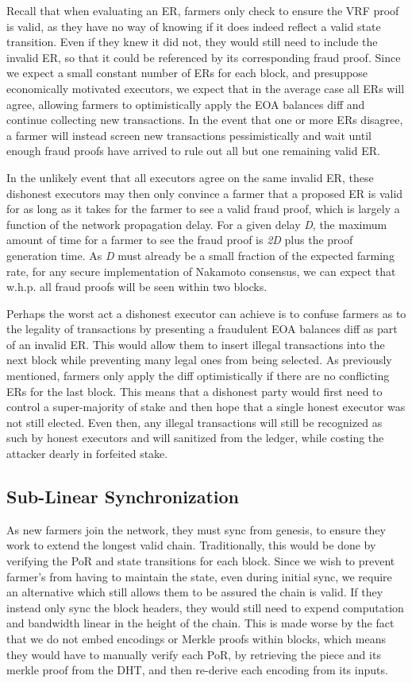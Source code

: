 \documentclass[conference]{IEEEtran}
\begin{document}
Recall that when evaluating an ER, farmers only check to ensure the VRF proof is valid, as they have no way of knowing if it does indeed reflect a valid state transition. Even if they knew it did not, they would still need to include the invalid ER, so that it could be referenced by its corresponding fraud proof. Since we expect a small constant number of ERs for each block, and presuppose economically motivated executors, we expect that in the average case all ERs will agree, allowing farmers to optimistically apply the EOA balances diff and continue collecting new transactions. In the event that one or more ERs disagree, a farmer will instead screen new transactions pessimistically and wait until enough fraud proofs have arrived to rule out all but one remaining valid ER. 

In the unlikely event that all executors agree on the same invalid ER, these dishonest executors may then only convince a farmer that a proposed ER is valid for as long as it takes for the farmer to see a valid fraud proof, which is largely a function of the network propagation delay. For a given delay \textit{D}, the maximum amount of time for a farmer to see the fraud proof is \textit{2D} plus the proof generation time. As \textit{D} must already be a small fraction of the expected farming rate, for any secure implementation of Nakamoto consensus, we can expect that w.h.p. all fraud proofs will be seen within two blocks. 

Perhaps the worst act a dishonest executor can achieve is to confuse farmers as to the legality of transactions by presenting a fraudulent EOA balances diff as part of an invalid ER. This would allow them to insert illegal transactions into the next block while preventing many legal ones from being selected. As previously mentioned, farmers only apply the diff optimistically if there are no conflicting ERs for the last block. This means that a dishonest party would first need to control a super-majority of stake and then hope that a single honest executor was not still elected. Even then, any illegal transactions will still be recognized as such by honest executors and will sanitized from the ledger, while costing the attacker dearly in forfeited stake. 

\subsection{Sub-Linear Synchronization}

As new farmers join the network, they must sync from genesis, to ensure they work to extend the longest valid chain. Traditionally, this would be done by verifying the PoR and state transitions for each block. Since we wish to prevent farmer's from having to maintain the state, even during initial sync, we require an alternative which still allows them to be assured the chain is valid. If they instead only sync the block headers, they would still need to expend computation and bandwidth linear in the height of the chain. This is made worse by the fact that we do not embed encodings or Merkle proofs within blocks, which means they would have to manually verify each PoR, by retrieving the piece and its merkle proof from the DHT, and then re-derive each encoding from its inputs. 
\end{document}
